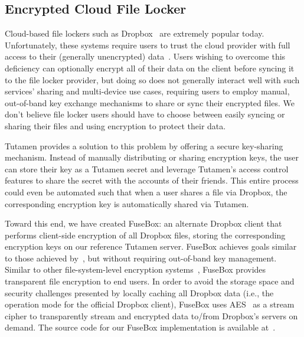 \subsection{Encrypted Cloud File Locker}

Cloud-based file lockers such as Dropbox~\cite{dropbox} are extremely
popular today. Unfortunately, these systems require users to trust the
cloud provider with full access to their (generally unencrypted)
data~\cite{vintsurf-dropbox}. Users wishing to overcome this
deficiency can optionally encrypt all of their data on the client
before syncing it to the file locker provider, but doing so does not
generally interact well with such services' sharing and multi-device
use cases, requiring users to employ manual, out-of-band key
exchange mechanisms to share or sync their encrypted files. We don't
believe file locker users should have to choose between easily syncing
or sharing their files and using encryption to protect their data.

Tutamen provides a solution to this problem by offering a secure
key-sharing mechanism. Instead of manually distributing or sharing
encryption keys, the user can store their key as a Tutamen secret and
leverage Tutamen's access control features to share the secret with
the accounts of their friends. This entire process could even be
automated such that when a user shares a file via Dropbox, the
corresponding encryption key is automatically shared via Tutamen.

Toward this end, we have created FuseBox: an alternate Dropbox client
that performs client-side encryption of all Dropbox files, storing the
corresponding encryption keys on our reference Tutamen server. FuseBox
achieves goals similar to those achieved by~\cite{goh2003}, but
without requiring out-of-band key management. Similar to other
file-system-level encryption systems~\cite{blaze1993, Cattaneo2001,
  halcrow}, FuseBox provides transparent file encryption to end
users. In order to avoid the storage space and security challenges
presented by locally caching all Dropbox data (i.e., the operation mode
for the official Dropbox client), FuseBox uses AES~\cite{daemen1999,
  nist2001} as a stream cipher to transparently stream and encrypted
data to/from Dropbox's servers on demand.  The source code for our
FuseBox implementation is available at~\cite{fusebox}.

